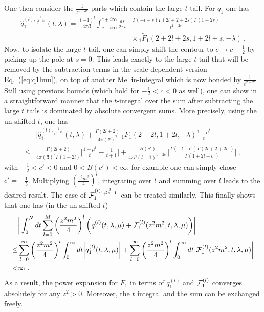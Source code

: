 \documentclass[a4paper,11pt]{article}
\begin{document}
One then consider the $\frac{1}{t^{1-2s}}$ parts which contain the large $t$ tail. For $q_1$ one has 
\begin{align}
\hat q_1^{(l),\frac{1}{t^{1-2s}}}(t,\lambda)=\frac{(-1)^l}{4\pi l!}\int_{c-i\infty}^{c+i\infty}\frac{ds}{2\pi i}&\frac{\Gamma(-l-s)\Gamma(2l+2+2s)\Gamma(1-2s)}{t^{1-2s}}\nonumber \\ & \times \,_1\tilde F_1(2+2l+2s,1+2l+s,-\lambda) \ .
\end{align}
Now, to isolate the large $t$ tail, one can simply shift the contour to $c \rightarrow c-\frac{1}{2}$ by picking up the pole at $s=0$. This leads exactly to the large $t$ tail that will be removed by the subtraction terms in the scale-dependent version Eq.~(\ref{eq:q1lmu}), on top of another Mellin-integral which is now bonded by $\frac{1}{t^{2-2c}}$. Still using previous bounds (which hold for $-\frac{1}{2}<c<0$ as well), one can show in a straightforward manner that the $t$-integral over the sum after subtracting the large $t$ tails is dominated by absolute convergent sums. More precisely, using the un-shifted $t$, one has
\begin{align}
&\bigg|\hat q_1^{(l),\frac{1}{t^{1-2s}}}(t,\lambda)+\frac{\Gamma(2l+2)}{4\pi (l!)^2}\,_1\tilde F_1(2+2l,1+2l,-\lambda)\frac{1-\mu^t}{t} \bigg| \nonumber \\ 
\le &\frac{\Gamma(2l+2)}{4\pi (l!)^2\Gamma(1+2l)} \bigg|\frac{1-\mu^t}{t}-\frac{1}{t+1}\bigg|+\frac{B(c')}{4\pi l!(t+1)^{1-2c'}}\bigg|\frac{\Gamma(-l-c')\Gamma(2l+2+2c')}{\Gamma(1+2l+c')}\bigg| \ ,
\end{align}
with $-\frac{1}{2}<c'<0$ and $0<B(c')<\infty$, for example one can simply chose $c'=-\frac{1}{5}$. Multiplying $\left(\frac{z^2m^2}{4}\right)^l$, integrating over $t$ and summing over $l$ leads to the desired result.  The case of ${\cal F}_1^{(l),\frac{1}{t^{2s-1}}}$ can be treated similarly.  This finally shows that one has (in the un-shifted $t$)
\begin{align}
&\bigg|\int_{0}^{N} dt \sum_{l=0}^{M}\left(\frac{z^2m^2}{4}\right)^l \bigg(q_1^{(l)}(t,\lambda,\mu)+{\cal F}_{1}^{(l)}(z^2m^2,t,\lambda,\mu)\bigg)\bigg| \nonumber \\ 
\le &\sum_{l=0}^{\infty}\left(\frac{z^2m^2}{4}\right)^l\int_{0}^{\infty} dt \bigg|q_1^{(l)}(t,\lambda,\mu)\bigg|+\sum_{l=0}^{\infty}\left(\frac{z^2m^2}{4}\right)^l\int_{0}^{\infty} dt \bigg|{\cal F}_{1}^{(l)}(z^2m^2,t,\lambda,\mu)\bigg|\nonumber \\<&\infty \ .
\end{align}
As a result, the power expansion for $F_1$ in terms of $q_1^{(l)}$ and ${\cal F}_{1}^{(l)}$ converges absolutely for any $z^2>0$. Moreover, the $t$ integral and the sum can be exchanged freely.  
\end{document}
